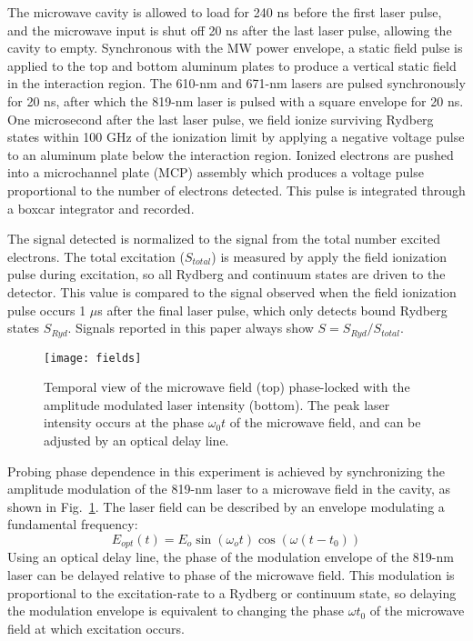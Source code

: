 \documentclass[aps,pra,preprint,groupedaddress]{revtex4-1}
\begin{document}

The microwave cavity is allowed to load for 240 ns before the first laser pulse, and the microwave input is shut off 20 ns after the last laser pulse, allowing the cavity to empty. Synchronous with the MW power envelope, a static field pulse is applied to the top and bottom aluminum plates to produce a vertical static field in the interaction region. The 610-nm and 671-nm lasers are pulsed synchronously for 20 ns, after which the 819-nm laser is pulsed with a square envelope for 20 ns. One microsecond after the last laser pulse, we field ionize surviving Rydberg states within 100 GHz of the ionization limit by applying a negative voltage pulse to an aluminum plate below the interaction region. Ionized electrons are pushed into a microchannel plate (MCP) assembly which produces a voltage pulse proportional to the number of electrons detected. This pulse is integrated through a boxcar integrator and recorded.

The signal detected is normalized to the signal from the total number excited electrons. The total excitation ($S_{total}$) is measured by apply the field ionization pulse during excitation, so all Rydberg and continuum states are driven to the detector. This value is compared to the signal observed when the field ionization pulse occurs 1 $\mu$s after the final laser pulse, which only detects bound Rydberg states $S_{Ryd}$. Signals reported in this paper always show $S = S_{Ryd} / S_{total}$.

\begin{figure}
	\texttt{[image: fields]}
	\caption{Temporal view of the microwave field (top) phase-locked with the amplitude modulated laser intensity (bottom). The peak laser intensity occurs at the phase $\omega_0 t$ of the microwave field, and can be adjusted by an optical delay line.}
	\label{fig:AMLaser}
\end{figure}

Probing phase dependence in this experiment is achieved by synchronizing the amplitude modulation of the 819-nm laser to a microwave field in the cavity, as shown in Fig.~\ref{fig:AMLaser}. The laser field can be described by an envelope modulating a fundamental frequency:
\begin{equation}
E_{opt}(t) = E_o \sin{(\omega_o t)} \cos{(\omega(t-t_0))}
\end{equation}
Using an optical delay line, the phase of the modulation envelope of the 819-nm laser can be delayed relative to phase of the microwave field. This modulation is proportional to the excitation-rate to a Rydberg or continuum state, so delaying the modulation envelope is equivalent to changing the phase $\omega t_0$ of the microwave field at which excitation occurs.
\end{document}
